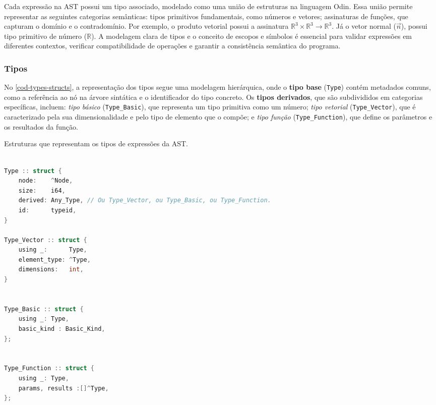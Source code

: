 Cada expressão na AST possui um tipo associado, modelado como uma união de estruturas na linguagem Odin. Essa união permite representar as seguintes categorias semânticas: tipos primitivos fundamentais, como números e vetores; assinaturas de funções, que capturam o domínio e o contradomínio. Por exemplo, o produto vetorial possui a assinatura $\mathbb{R}^3 \times \mathbb{R}^3 \to \mathbb{R}^3$. Já o vetor normal ($\vec{n}$), possui tipo primitivo de número ($\mathbb{R}$). A modelagem clara de tipos e o conceito de escopos e símbolos é essencial para validar expressões em diferentes contextos, verificar compatibilidade de operações e garantir a consistência semântica do programa.


\subsubsection{Tipos}

No \autoref{cod-types-structs}, a representação dos tipos segue uma modelagem hierárquica, onde o \textbf{tipo base} (\texttt{Type}) contém metadados comuns, como a referência ao nó na árvore sintática e o identificador do tipo concreto. Os \textbf{tipos derivados}, que são subdivididos em categorias específicas, incluem: \textit{tipo básico} (\texttt{Type\_Basic}), que representa um tipo primitiva como um número; \textit{tipo vetorial} (\texttt{Type\_Vector}), que é caracterizado pela sua dimensionalidade e pelo tipo de elemento que o compõe; e \textit{tipo função} (\texttt{Type\_Function}), que define os parâmetros e os resultados da função.

\begin{codigo}[H]
    \caption{\small Estruturas que representam os tipos de expressões da AST.}
    \label{cod-types-structs}
\begin{lstlisting}[language=C, numbers=none, frame=none, inputencoding=latin1]

Type :: struct {
    node:    ^Node,
    size:    i64,
    derived: Any_Type, // Ou Type_Vector, ou Type_Basic, ou Type_Function.
    id:      typeid,
}

Type_Vector :: struct {
    using _:      Type,
    element_type: ^Type,
    dimensions:   int,
}


Type_Basic :: struct {
    using _: Type,
    basic_kind : Basic_Kind,
};


Type_Function :: struct {
    using _: Type,
    params, results :[]^Type,
};

\end{lstlisting}
\end{codigo}


